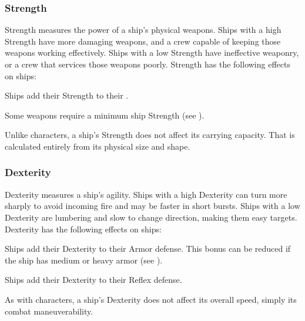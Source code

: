         \subsubsection{Strength}
            Strength measures the power of a ship's physical weapons.
            Ships with a high Strength have more damaging weapons, and a crew capable of keeping those weapons working effectively.
            Ships with a low Strength have ineffective weaponry, or a crew that services those weapons poorly.
            Strength has the following effects on ships:
            \begin{raggeditemize}
                \item Ships add their Strength to their .
                \item Some weapons require a minimum ship Strength (see ).
            \end{raggeditemize}

            Unlike characters, a ship's Strength does not affect its carrying capacity.
            That is calculated entirely from its physical size and shape.

        \subsubsection{Dexterity}
            Dexterity measures a ship's agility.
            Ships with a high Dexterity can turn more sharply to avoid incoming fire and may be faster in short bursts.
            Ships with a low Dexterity are lumbering and slow to change direction, making them easy targets.
            Dexterity has the following effects on ships:
            \begin{raggeditemize}
                \item Ships add their Dexterity to their Armor defense.
                    This bonus can be reduced if the ship has medium or heavy armor (see ).
                \item Ships add their Dexterity to their Reflex defense.
            \end{raggeditemize}

            As with characters, a ship's Dexterity does not affect its overall speed, simply its combat maneuverability.

